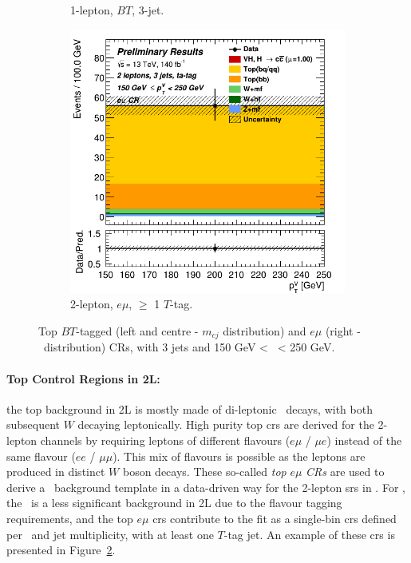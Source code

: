 \begin{figure}[h!]
\begin{subfigure}[b]{0.32\textwidth}
      \caption{1-lepton, $BT$, 3-jet.}
      \label{fig:plots_VHcc_ex_1L_TopCR}
  \end{subfigure}
  \begin{subfigure}[b]{0.32\textwidth}
    \centering
    \includegraphics[width=\textwidth]{Images/VH/Own_fit/prefit_VHcc/Region_distpTV_BMax250_BMin150_Dtopemucr_J3_TTypeta_T2_L2_Y6051_Prefit.png}
    \caption{2-lepton, $e\mu$, $\geq$ 1 $T$-tag.}
    \label{fig:plots_VHcc_ex_2L_TopCR}
\end{subfigure}
  \caption{Top $BT$-tagged (left and centre - $m_{cj}$ distribution) and $e\mu$ (right - \ptv\ distribution) CRs, with 3 jets and 150 GeV < \ptv\ < 250 GeV.}
  \label{fig:plots_VHcc_ex_TopCR}
\end{figure} 

\paragraph{Top Control Regions in 2L:} the top background in 2L is mostly made of di-leptonic \ttb\ decays, with both subsequent $W$ decaying leptonically. High purity top \glspl{cr} are derived for the 2-lepton channels by requiring leptons of different flavours ($e\mu$ / $\mu e$) instead of the same flavour ($ee$ / $\mu\mu$). This mix of flavours is possible as the leptons are produced in distinct $W$ boson decays. These so-called \textit{top} $e\mu$ \textit{CRs} are used to derive a \ttb\ background template in a data-driven way for the 2-lepton \glspl{sr} in \vhb. For \vhc, the \ttb\ is a less significant background in 2L due to the flavour tagging requirements, and the top $e\mu$ \glspl{cr} contribute to the fit as a single-bin \glspl{cr} defined per \ptv\ and jet multiplicity, with at least one $T$-tag jet. An example of these \glspl{cr} is presented in Figure~\ref{fig:plots_VHcc_ex_2L_TopCR}.

